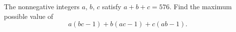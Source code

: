 The nonnegative integers $a$, $b$, $c$ satisfy $a+b+c=576$. Find the maximum possible value of
\[
a(bc-1)+b(ac-1)+c(ab-1).
\]
